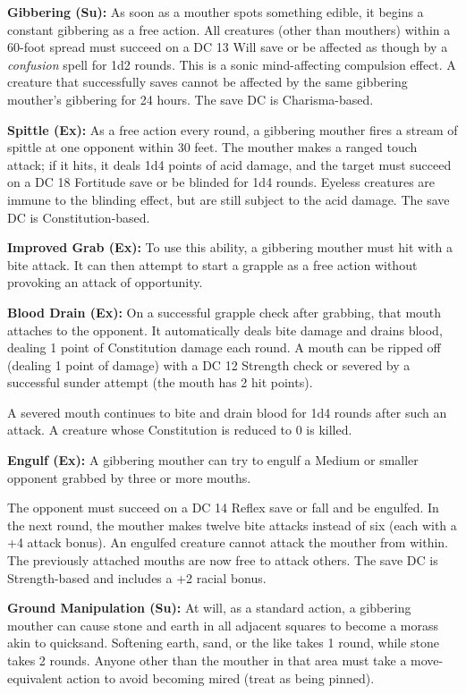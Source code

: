 \documentclass{article}
\begin{document}
\textbf{Gibbering (Su):} As soon as a mouther spots something edible, it begins 
a constant gibbering as a free action. All creatures (other than mouthers) within 
a 60-foot spread must succeed on a DC 13 Will save or be affected as though by 
a \textit{confusion }spell for 1d2 rounds. This is a sonic mind-affecting compulsion 
effect. A creature that successfully saves cannot be affected by the same gibbering 
mouther's gibbering for 24 hours. The save DC is Charisma-based.

\textbf{Spittle (Ex):} As a free action every round, a gibbering mouther fires 
a stream of spittle at one opponent within 30 feet. The mouther makes a ranged 
touch attack; if it hits, it deals 1d4 points of acid damage, and the target must 
succeed on a DC 18 Fortitude save or be blinded for 1d4 rounds. Eyeless creatures 
are immune to the blinding effect, but are still subject to the acid damage. The 
save DC is Constitution-based.

\textbf{Improved Grab (Ex):} To use this ability, a gibbering mouther must hit 
with a bite attack. It can then attempt to start a grapple as a free action without 
provoking an attack of opportunity. 

\textbf{Blood Drain (Ex):} On a successful grapple check after grabbing, that mouth 
attaches to the opponent. It automatically deals bite damage and drains blood, 
dealing 1 point of Constitution damage each round. A mouth can be ripped off (dealing 
1 point of damage) with a DC 12 Strength check or severed by a successful sunder 
attempt (the mouth has 2 hit points). 

A severed mouth continues to bite and drain blood for 1d4 rounds after such an 
attack. A creature whose Constitution is reduced to 0 is killed.

\textbf{Engulf (Ex): }A gibbering mouther can try to engulf a Medium or smaller 
opponent grabbed by three or more mouths. 

The opponent must succeed on a DC 14 Reflex save or fall and be engulfed. In the 
next round, the mouther makes twelve bite attacks instead of six (each with a +4 
attack bonus). An engulfed creature cannot attack the mouther from within. The 
previously attached mouths are now free to attack others. The save DC is Strength-based 
and includes a +2 racial bonus. 

\textbf{Ground Manipulation (Su):} At will, as a standard action, a gibbering mouther 
can cause stone and earth in all adjacent squares to become a morass akin to quicksand. 
Softening earth, sand, or the like takes 1 round, while stone takes 2 rounds. Anyone 
other than the mouther in that area must take a move-equivalent action to avoid 
becoming mired (treat as being pinned).
\end{document}
